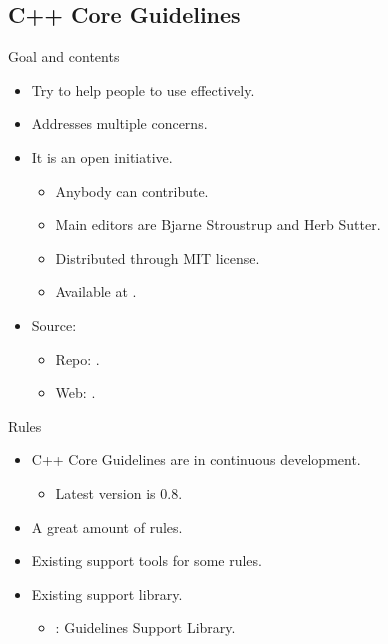 \subsection{C++ Core Guidelines}

\begin{frame}[t]{Goal and contents}
\begin{itemize}
  \item Try to help people to use  effectively.

  \vfill
  \item Addresses multiple concerns.

  \vfill
  \item It is an open initiative.
    \begin{itemize}
      \item Anybody can contribute.
      \item Main editors are Bjarne Stroustrup and Herb Sutter.
      \item Distributed through MIT license.
      \item Available at .
    \end{itemize}

  \vfill
  \item Source:
    \begin{itemize}
      \item Repo: .
      \item Web: .
    \end{itemize}
\end{itemize}
\end{frame}

\begin{frame}[t]{Rules}
\begin{itemize}
  \item C++ Core Guidelines are in continuous development.
    \begin{itemize}
      \item Latest version is 0.8.
    \end{itemize}

  \vfill
  \item A great amount of rules.

  \vfill
  \item Existing support tools for some rules.

  \vfill
  \item Existing support library.
    \begin{itemize}
      \item {}: Guidelines Support Library.
    \end{itemize}
\end{itemize}
\end{frame}

